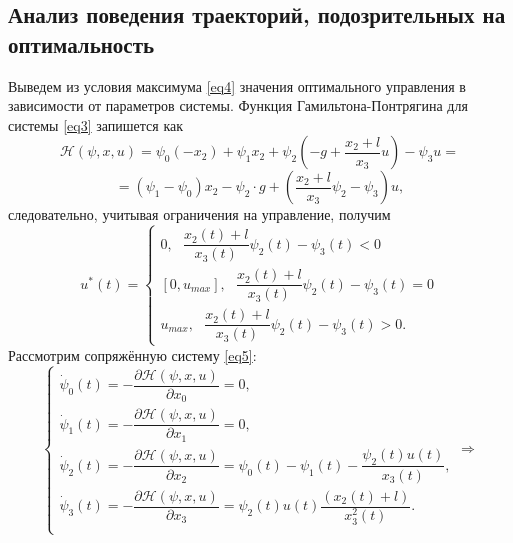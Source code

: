 \documentclass[a4paper,12pt]{article}
\begin{document}
\subsection{Анализ поведения траекторий, подозрительных на оптимальность}
Выведем из условия максимума \eqref{eq4} значения оптимального управления в зависимости от параметров системы. Функция Гамильтона-Понтрягина для системы \eqref{eq3} запишется как 
\[ \mathcal{H}(\psi, x, u) = \psi_0(-x_2) + \psi_1x_2 + \psi_2\left(-g + \dfrac{x_2 + l}{x_3}u\right) - \psi_3u = \]
\[ = (\psi_1 - \psi_0)x_2 - \psi_2 \cdot g + \left(\dfrac{x_2 + l}{x_3}\psi_2 - \psi_3\right)u,\]
следовательно, учитывая ограничения на управление, получим
$$u^*(t) = \begin{cases}
	0, \ \ \ \dfrac{x_2(t) + l}{x_3(t)}\psi_2(t) - \psi_3(t) < 0 \\
	
[0, u_{max}], \ \ \ \dfrac{x_2(t) + l}{x_3(t)}\psi_2(t) - \psi_3(t) = 0 \\
	u_{max}, \ \ \ \dfrac{x_2(t) + l}{x_3(t)}\psi_2(t) - \psi_3(t) > 0.
\end{cases}$$
Рассмотрим сопряжённую систему \eqref{eq5}:
$$\begin{cases}
	\dot{\psi}_0(t) = - \dfrac{\partial{\mathcal{H}(\psi, x, u)}}{\partial{x_0}} = 0, \\
	\dot{\psi}_1(t) = - \dfrac{\partial{\mathcal{H}(\psi, x, u)}}{\partial{x_1}} = 0, \\
	\dot{\psi}_2(t) = - \dfrac{\partial{\mathcal{H}(\psi, x, u)}}{\partial{x_2}} = \psi_{0}(t) - \psi_{1}(t) - \dfrac{\psi_{2}(t)u(t)}{x_{3}(t)}, \\
	\dot{\psi}_3(t) = - \dfrac{\partial{\mathcal{H}(\psi, x, u)}}{\partial{x_3}} = \psi_2(t)u(t) \dfrac{(x_2(t) + l)}{x_3^2(t)}. \\
\end{cases} \Rightarrow$$
\end{document}
